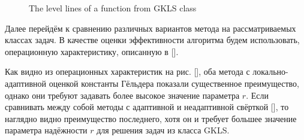 \begin{figure}[ht]
    \centering
    \qquad
    \caption{The level lines of a function from GKLS class}
    \label{fig:gkls_isolines}
\end{figure}

Далее перейдём к сравнению различных вариантов метода на рассматриваемых классах задач.
В качестве оценки эффективности алгоритма будем использовать, операционную характеристику,
описанную в [].

Как видно из операционных характеристик на рис. [], оба метода с локально-адаптивной
оценкой константы Гёльдера показали существенное преимущество, однако они требуют
задавать более высокое значение параметра \(r\). Если сравнивать между собой методы с
адаптивной и неадаптивной свёрткой [], то наглядно видно преимущество последнего,
хотя он и требует большее значение параметра надёжности \(r\) для решения задач из класса GKLS.

